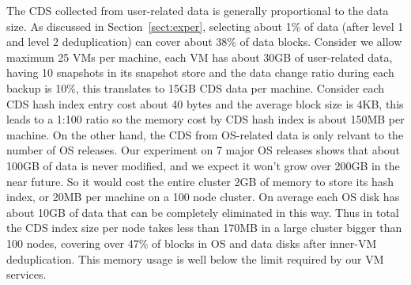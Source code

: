 The CDS collected from user-related data is generally proportional to the data size.
As discussed in Section~\ref{sect:exper}, selecting about 1\% of data (after level 1 and level 2 deduplication)
can cover about 38\% of data blocks. Consider we allow maximum 25 VMs per machine, each VM has
about 30GB of user-related data, having 10 snapshots in its snapshot store and the data change ratio during
each backup is 10\%, this translates to 15GB CDS data per machine. 
Consider each CDS hash index entry cost about 40 bytes and the average block size is 4KB, this leads to
a 1:100 ratio so the 
memory cost by CDS hash index is about 150MB per machine.
On the other hand, the CDS from OS-related data is only relvant to the number of OS releases.
Our experiment on 7 major OS releases shows that about 100GB of data is never modified, and we expect
it won't grow over 200GB in the near future. So it would cost the entire cluster 2GB of memory to
store its hash index, or 20MB per machine on a 100 node cluster. On average each OS disk has about 10GB
of data that can be completely eliminated in this way.
Thus in total the CDS index size per node takes less than 170MB in a large cluster bigger than 100 nodes, 
covering over 47\% of blocks in OS and data disks after inner-VM deduplication.
This memory usage is well below the limit required by our VM services.

